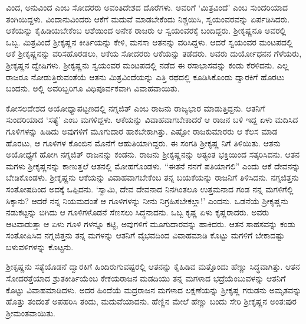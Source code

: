 ವಿಂದ, ಅನುವಿಂದ ಎಂಬ ಸೋದರರು ಅವಂತಿದೇಶದ ದೊರೆಗಳು. ಅವರಿಗೆ ‘ಮಿತ್ರವಿಂದೆ’ ಎಂಬ ಸುಂದರಿಯಾದ ತಂಗಿಯಿದ್ದಳು. ವಿಂದಾನುವಿಂದರು ಆಕೆಗೆ ಮದುವೆ ಮಾಡಬೇಕೆಂದು ನಿಶ್ಚಯಿಸಿ, ಸ್ವಯಂವರವನ್ನು ಏರ್ಪಡಿಸಿದರು. ಆಕೆಯನ್ನು ಕೈಹಿಡಿಯಬೇಕೆಂಬ ಆಶೆಯಿಂದ ಅನೇಕ ರಾಜರು ಆ ಸ್ವಯಂವರಕ್ಕೆ ಬಂದಿದ್ದರು. ಶ್ರೀಕೃಷ್ಣನೂ ಅವರಲ್ಲಿ ಒಬ್ಬ. ಮಿತ್ರವಿಂದೆ ಶ್ರೀಕೃಷ್ಣನ ಕೀರ್ತಿಯನ್ನು ಕೇಳಿ, ಮನಸಾ ಆತನನ್ನು ವರಿಸಿದ್ದಳು. ಆದರೆ ಸ್ವಯಂವರ ಮಂಟಪದಲ್ಲಿ ಆಕೆ ಶ್ರೀಕೃಷ್ಣನನ್ನು ವರಿಸಹೊರಡಲು, ಆಕೆಯ ಸೋದರರು ಆಕೆಯನ್ನು ತಡೆದರು. ಅವರು ದುರ್ಯೋಧನನ ಗೆಳೆಯರು, ಶ್ರೀಕೃಷ್ಣನ ದ್ವೇಷಿಗಳು. ಶ್ರೀಕೃಷ್ಣನು ಸ್ವಯಂವರ ಮಂಟಪದಲ್ಲಿ ನಡೆದ ಈ ರಸಾಭಾಸವನ್ನು ಕಂಡು ಕೆರಳಿದನು. ಎಲ್ಲ ರಾಜರೂ ನೋಡುತ್ತಿರುವಂತೆಯೆ ಆತನು ಮಿತ್ರವಿಂದೆಯನ್ನು ಎತ್ತಿ ರಥದಲ್ಲಿ ಕೂಡಿಸಿಕೊಂಡು ದ್ವಾರಕಿಗೆ ಹೊರಟು ಬಂದನು. ಅಲ್ಲಿ ಅವರಿಬ್ಬರಿಗೂ ವಿಧಿಪೂರ್ವಕವಾಗಿ ವಿವಾಹವಾಯಿತು.

ಕೋಸಲದೇಶದ ಅಯೋಧ್ಯಾಪಟ್ಟಣದಲ್ಲಿ ನಗ್ನಜಿತ್ ಎಂಬ ರಾಜನು ರಾಜ್ಯಭಾರ ಮಾಡುತ್ತಿದ್ದನು. ಆತನಿಗೆ ಸುಂದರಿಯಾದ ‘ಸತ್ಯೆ’ ಎಂಬ ಮಗಳಿದ್ದಳು. ಆಕೆಯನ್ನು ವಿವಾಹವಾಗಬೇಕಾದರೆ ಆ ರಾಜನ ಬಳಿ ಇದ್ದ ಏಳು ಮದಿಸಿದ ಗೂಳಿಗಳನ್ನು ಹಿಡಿದು ಅವುಗಳಿಗೆ ಮೂಗುದಾರ ಹಾಕಬೇಕಾಗಿತ್ತು. ಎಷ್ಟೋ ರಾಜಕುಮಾರರು ಆ ಕೆಲಸ ಮಾಡ ಹೊರಟು, ಆ ಗೂಳಿಗಳ ಕೊಂಬಿನ ಮೊನೆಗೆ ಆಹುತಿಯಾಗಿದ್ದರು. ಈ ಸಂಗತಿ ಶ್ರೀಕೃಷ್ಣ ನಿಗೆ ತಿಳಿಯಿತು. ಆತನು ಅಯೋಧ್ಯೆಗೆ ಹೋಗಿ ನಗ್ನಜಿತ್ ರಾಜನನ್ನು ಕಂಡನು. ರಾಜನು ಶ್ರೀಕೃಷ್ಣನನ್ನು ಅತ್ಯಂತ ಭಕ್ತಿಯಿಂದ ಸತ್ಕರಿಸಿದನು. ಆತನ ಮಗಳು ಶ್ರೀಕೃಷ್ಣನನ್ನು ಕಾಣುತ್ತಲೆ ಆತನಲ್ಲಿ ಮೋಹಗೊಂಡಳು. “ಈತನೆ ನನಗೆ ಪತಿಯಾಗಲಿ” ಎಂದು ಆಕೆ ದೇವನನ್ನು ಬೇಡಿಕೊಂಡಳು. ಶ್ರೀಕೃಷ್ಣನು ಆಕೆಯನ್ನು ವಿವಾಹವಾಗಬೇಕೆಂಬ ತನ್ನ ಬಯಕೆಯನ್ನು ರಾಜನಿಗೆ ತಿಳಿಸಿದನು. ನಗ್ನಜಿತ್ತನು ಸಂತೋಷದಿಂದ ಅದಕ್ಕೆ ಒಪ್ಪಿದನು. ‘ಸ್ವಾಮಿ, ದೇವ ದೇವನಾದ ನಿನಗಿಂತಲೂ ಉತ್ತಮನಾದ ಗಂಡ ನನ್ನ ಮಗಳಿಗೆಲ್ಲಿ ಸಿಕ್ಕಾನು? ಆದರೆ ನನ್ನ ನಿಯಮದಂತೆ ಆ ಗೂಳಿಗಳನ್ನು ನೀನು ನಿಗ್ರಹಿಸಬೇಕಲ್ಲಾ!’ ಎಂದನು. ಒಡನೆಯೆ ಶ್ರೀಕೃಷ್ಣನು ನಡುಕಟ್ಟನ್ನು ಬಿಗಿದು ಆ ಗೂಳಿಗಳೊಡನೆ ಸೆಣಸಲು ಸಿದ್ಧನಾದನು. ಒಬ್ಬ ಕೃಷ್ಣ ಏಳು ಕೃಷ್ಣರಾದರು. ಅವರು ಆಟವಾಡುತ್ತಾ ಆ ಏಳು ಗೂಳಿ ಗಳನ್ನೂ ಕಟ್ಟಿ, ಅವುಗಳಿಗೆ ಮೂಗುದಾರವನ್ನು ಹಾಕಿದರು. ಆತನ ಸಾಹಸವನ್ನು ಕಂಡು ಸಂತೋಷಿಸಿದ ನಗ್ನಜಿತ್ತನು ತನ್ನ ಮಗಳನ್ನು ಆತನಿಗೆ ವೈಭವದಿಂದ ವಿವಾಹಮಾಡಿ ಕೊಟ್ಟು ಮಗಳಿಗೆ ಬೇಕಾದಷ್ಟು ಬಳುವಳಿಗಳನ್ನು ಕೊಟ್ಟನು.

ಶ್ರೀಕೃಷ್ಣನು ಸತ್ಯೆಯೊಡನೆ ದ್ವಾರಕಿಗೆ ಹಿಂದಿರುಗುವಷ್ಟರಲ್ಲಿ ಆತನನ್ನು ಕೈಹಿಡಿವ ಮತ್ತೊಂದು ಹೆಣ್ಣು ಸಿದ್ಧವಾಗಿತ್ತು. ಆತನ ಸೋದರತ್ತೆಯಾದ ಶ್ರುತಕೀರ್ತಿಯೆಂಬ ಕೇಕಯರಾಜನ ಮಡದಿಯು ತನ್ನ ಮಗಳಾದ ಭದ್ರೆಯೆಂಬುವಳನ್ನು ಆತನಿಗೆ ಕೊಟ್ಟು ವಿವಾಹಮಾಡಿದಳು. ಅದರ ಹಿಂದೆಯೆ ಮದ್ರರಾಜನ ಮಗಳಾದ ಲಕ್ಷಣೆಯನ್ನು ಶ್ರೀಕೃಷ್ಣ ಗರುಡನು ಅಮೃತವನ್ನು ಹೊತ್ತು ತಂದಂತೆ ಅಪಹರಿಸಿ ತಂದು, ಮದುವೆಯಾದನು. ಹೆಣ್ಣಿನ ಮೇಲೆ ಹೆಣ್ಣು ಬಂದು ಸೇರಿ ಶ್ರೀಕೃಷ್ಣನ ಅಂತಃಪುರ ಶ್ರೀಮಂತವಾಯಿತು.

